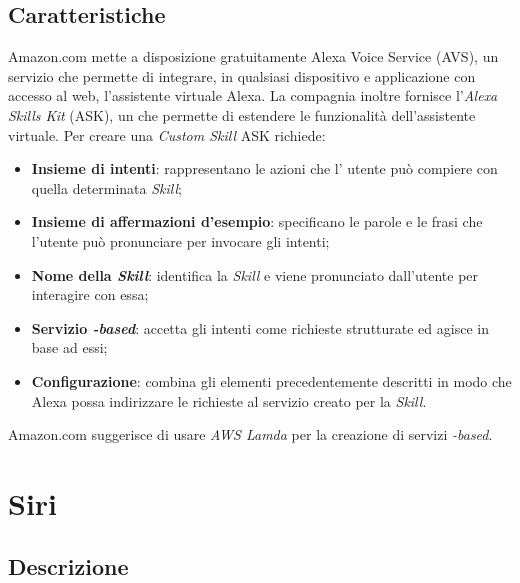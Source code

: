 \documentclass[a4paper,titlepage]{article}
\begin{document}
	\subsection{Caratteristiche}
		Amazon.com mette a disposizione gratuitamente Alexa Voice Service (AVS), un servizio che permette di integrare, in qualsiasi dispositivo e applicazione con accesso al web, l'assistente virtuale Alexa. La compagnia inoltre fornisce l'\textit{Alexa Skills Kit} (ASK), un  che permette di estendere le funzionalità dell'assistente virtuale. Per creare una \textit{Custom Skill} ASK richiede:
		\begin{itemize}
			\item \textbf{Insieme di intenti}: rappresentano le azioni che l' utente può compiere con quella determinata \textit{Skill}; 
			\item \textbf{Insieme di affermazioni d'esempio}: specificano le parole e le frasi che l'utente può pronunciare per invocare gli intenti;
			\item \textbf{Nome della \textit{Skill}}: identifica la \textit{Skill} e viene pronunciato dall'utente per interagire con essa;
			\item \textbf{Servizio \textit{-based}}: accetta gli intenti come richieste strutturate ed agisce in base ad essi;
			\item \textbf{Configurazione}: combina gli elementi precedentemente descritti in modo che Alexa possa indirizzare le richieste al servizio creato per la \textit{Skill}.
			
		\end{itemize}
	Amazon.com suggerisce di usare \textit{AWS Lamda} per la creazione di servizi \textit{-based}.
		
	
\newpage	
	\section{Siri}
	\subsection{Descrizione}
	
\end{document}
